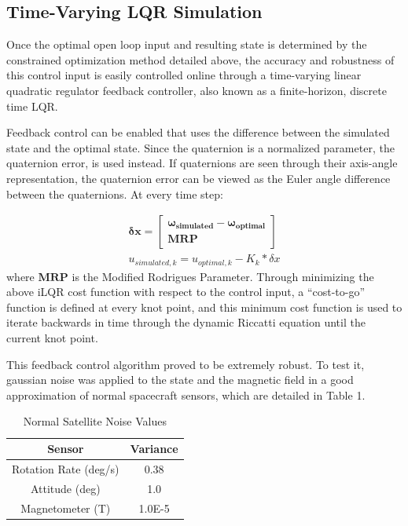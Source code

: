 \documentclass[letterpaper, preprint, paper,11pt]{IAA-AAS}	%
\begin{document}
\subsection{Time-Varying LQR Simulation}
Once the optimal open loop input and resulting state is determined by the constrained optimization method detailed above, the accuracy and robustness of this control input is easily controlled online through a time-varying linear quadratic regulator feedback controller, also known as a finite-horizon, discrete time LQR. 

Feedback control can be enabled that uses the difference between the simulated state and the optimal state. Since the quaternion is a normalized parameter, the quaternion error, is used instead. If quaternions are seen through their axis-angle representation, the quaternion error can be viewed as the Euler angle difference between the quaternions. At every time step:

\begin{align}
	\label{eq:13}
	\mathbf{\delta x} = 
	\begin{bmatrix}
	\mathbf{\omega_{simulated}} - \mathbf{\omega_{optimal}}\\
	\mathbf{MRP}
	\end{bmatrix}\\
	u_{simulated,k} = u_{optimal,k} - K_k * \delta x
\end{align}
where $\textbf{MRP}$ is the Modified Rodrigues Parameter\cite{MRP}. Through minimizing the above iLQR cost function with respect to the control input, a “cost-to-go” function is defined at every knot point, and this minimum cost function is used to iterate backwards in time through the dynamic Riccatti equation until the current knot point. 

This feedback control algorithm proved to be extremely robust. To test it, gaussian noise was applied to the state and the magnetic field in a good approximation of normal spacecraft sensors, which are detailed in Table 1. 

\begin{table}[htbp]
	\fontsize{10}{10}\selectfont
    \caption{Normal Satellite Noise Values}
   \label{tab:label}
        \centering 
   \begin{tabular}{c | c } %
      \hline 
      Sensor & Variance\\
      \hline
      Rotation Rate (deg/s) & 0.38\\
      \hline
      Attitude (deg) & 1.0\\
      \hline
      Magnetometer (T) & 1.0E-5\\
      \hline
   \end{tabular}
\end{table}
\end{document}
